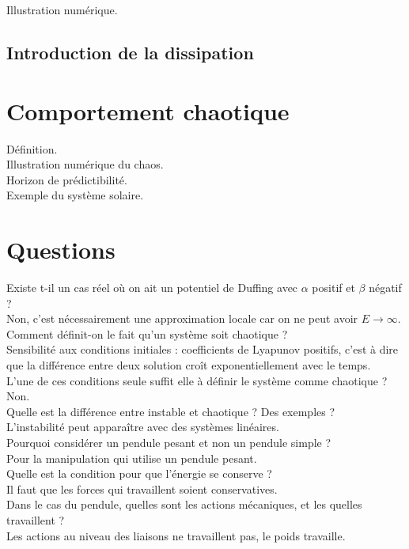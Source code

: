 \documentclass[12pt,prb,aps,epsf]{article}
\begin{document}
Illustration numérique.

\subsection{Introduction de la dissipation}

\section{Comportement chaotique}
Définition.\\
Illustration numérique du chaos.\\
Horizon de prédictibilité. \\
Exemple du système solaire.

\section*{Questions}
Existe t-il un cas réel où on ait un potentiel de Duffing avec $\alpha$ positif et $\beta$ négatif ?\\
Non, c'est nécessairement une approximation locale car on ne peut avoir $E\rightarrow \infty$.\\

Comment définit-on le fait qu'un système soit chaotique ?\\
Sensibilité aux conditions initiales : coefficients de Lyapunov positifs, c'est à dire que la différence entre deux solution croît exponentiellement avec le temps.\\

L'une de ces conditions seule suffit elle à définir le système comme chaotique ?\\
Non.\\

Quelle est la différence entre instable et chaotique ? Des exemples ?\\
L'instabilité peut apparaître avec des systèmes linéaires.\\

Pourquoi considérer un pendule pesant et non un pendule simple ?\\
Pour la manipulation qui utilise un pendule pesant.\\

Quelle est la condition pour que l'énergie se conserve ?\\
Il faut que les forces qui travaillent soient conservatives.\\

Dans le cas du pendule, quelles sont les actions mécaniques, et les quelles travaillent ?\\
Les actions au niveau des liaisons ne travaillent pas, le poids travaille.\\
\end{document}
